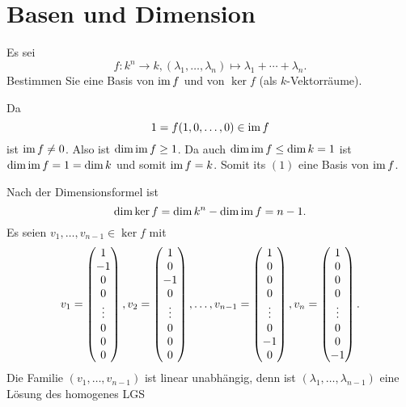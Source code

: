 \section{Basen und Dimension}


\begin{question}
 Es sei
 \[
  f \colon k^n \to k, (\lambda_1, \dotsc, \lambda_n) \mapsto \lambda_1 + \dotsb + \lambda_n.
 \]
 Bestimmen Sie eine Basis von $\operatorname{im} f$ und von $\ker f$ (als $k$-Vektorräume).
\end{question}
\begin{solution}
 Da
 \[
  1 = f(1, 0, \dotsc, 0) \in \operatorname{im} f
 \]
 ist $\operatorname{im} f \neq 0$. Also ist $\dim \operatorname{im} f \geq 1$. Da auch $\dim \operatorname{im} f \leq \dim k = 1$ ist $\dim \operatorname{im} f = 1 = \dim k$ und somit $\operatorname{im} f = k$. Somit its $(1)$ eine Basis von $\operatorname{im} f$.
 
 Nach der Dimensionsformel ist
 \[
  \dim \ker f = \dim k^n - \dim \operatorname{im} f = n-1.
 \]
 Es seien $v_1, \dotsc, v_{n-1} \in \ker f$ mit
 \begin{align*}
  v_1 = \begin{pmatrix}1 \\ -1 \\  0 \\ 0 \\ \vdots \\ 0 \\ 0 \\ 0\end{pmatrix},
  v_2 = \begin{pmatrix}1 \\  0 \\ -1 \\ 0 \\ \vdots \\ 0 \\ 0 \\ 0\end{pmatrix},
  \dotsc,
  v_{n-1} = \begin{pmatrix}1 \\ 0 \\ 0 \\ 0 \\ \vdots \\ 0 \\ -1 \\ 0\end{pmatrix},
  v_n = \begin{pmatrix}1 \\ 0 \\ 0 \\ 0 \\ \vdots \\ 0 \\ 0 \\ -1\end{pmatrix}.
 \end{align*}
 Die Familie $(v_1, \dotsc, v_{n-1})$ ist linear unabhängig, denn ist $(\lambda_1, \dotsc, \lambda_{n-1})$ eine Lösung des homogenes LGS

\end{solution}
